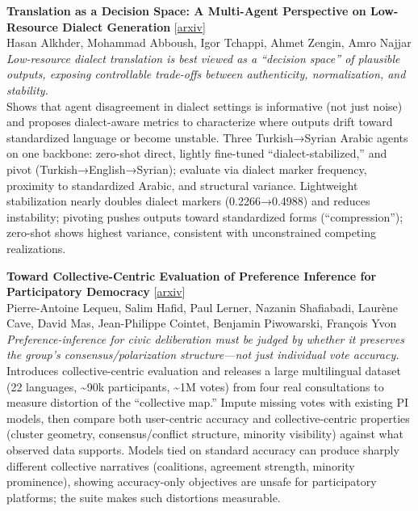 \documentclass[12pt,letterpaper]{article}
\begin{document}
\medskip

{\small\textbf{Translation as a Decision Space: A Multi-Agent Perspective on Low-Resource Dialect Generation}} {\scriptsize[\href{https://arxiv.org/abs/2609.04048}{arxiv}]}\\
{\scriptsize Hasan Alkhder, Mohammad Abboush, Igor Tchappi, Ahmet Zengin, Amro Najjar}\\

{\small\textit{Low-resource dialect translation is best viewed as a ``decision space'' of plausible outputs, exposing controllable trade-offs between authenticity, normalization, and stability.}}\\[1pt]
{\footnotesize Shows that agent disagreement in dialect settings is informative (not just noise) and proposes dialect-aware metrics to characterize where outputs drift toward standardized language or become unstable. Three Turkish→Syrian Arabic agents on one backbone: zero-shot direct, lightly fine-tuned ``dialect-stabilized,'' and pivot (Turkish→English→Syrian); evaluate via dialect marker frequency, proximity to standardized Arabic, and structural variance. Lightweight stabilization nearly doubles dialect markers (0.2266→0.4988) and reduces instability; pivoting pushes outputs toward standardized forms (``compression''); zero-shot shows highest variance, consistent with unconstrained competing realizations.}

\medskip

{\small\textbf{Toward Collective-Centric Evaluation of Preference Inference for Participatory Democracy}} {\scriptsize[\href{https://arxiv.org/abs/2609.02990}{arxiv}]}\\
{\scriptsize Pierre-Antoine Lequeu, Salim Hafid, Paul Lerner, Nazanin Shafiabadi, Laur\`ene Cave, David Mas, Jean-Philippe Cointet, Benjamin Piwowarski, Fran\c{c}ois Yvon}\\

{\small\textit{Preference-inference for civic deliberation must be judged by whether it preserves the group's consensus/polarization structure---not just individual vote accuracy.}}\\[1pt]
{\footnotesize Introduces collective-centric evaluation and releases a large multilingual dataset (22 languages, \textasciitilde{}90k participants, \textasciitilde{}1M votes) from four real consultations to measure distortion of the ``collective map.'' Impute missing votes with existing PI models, then compare both user-centric accuracy and collective-centric properties (cluster geometry, consensus/conflict structure, minority visibility) against what observed data supports. Models tied on standard accuracy can produce sharply different collective narratives (coalitions, agreement strength, minority prominence), showing accuracy-only objectives are unsafe for participatory platforms; the suite makes such distortions measurable.}
\end{document}
